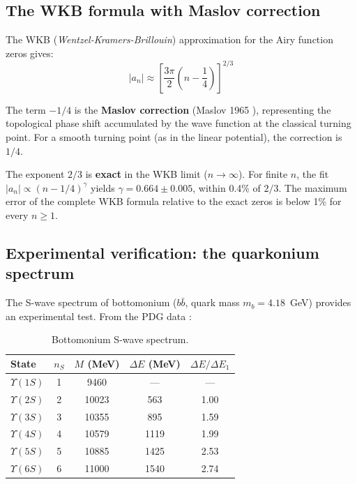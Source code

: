 \documentclass[10pt,a4paper]{article}
\begin{document}
\subsection{The WKB formula with Maslov correction}

The WKB (\textit{Wentzel-Kramers-Brillouin}) approximation for the Airy function zeros gives:
\begin{equation}
|a_n| \approx \left[\frac{3\pi}{2}\left(n - \frac{1}{4}\right)\right]^{2/3}
\end{equation}

The term $-1/4$ is the \textbf{Maslov correction} (Maslov 1965 \cite{Maslov1965}), representing the topological phase shift accumulated by the wave function at the classical turning point. For a smooth turning point (as in the linear potential), the correction is $1/4$.

The exponent $2/3$ is \textbf{exact} in the WKB limit ($n \to \infty$). For finite $n$, the fit $|a_n| \propto (n-1/4)^\gamma$ yields $\gamma = 0.664 \pm 0.005$, within 0.4\% of $2/3$. The maximum error of the complete WKB formula relative to the exact zeros is below 1\% for every $n \geq 1$.

\subsection{Experimental verification: the quarkonium spectrum}

The S-wave spectrum of bottomonium ($b\bar{b}$, quark mass $m_b = 4.18$~GeV) provides an experimental test. From the PDG data \cite{PDG2024}:

\begin{table}[h]
\centering
\caption{Bottomonium S-wave spectrum.}\label{tab:bottomonium}
\begin{tabular}{lcccc}
\toprule
State & $n_S$ & $M$ (MeV) & $\Delta E$ (MeV) & $\Delta E / \Delta E_1$ \\
\midrule
$\Upsilon(1S)$ & 1 & 9460 & --- & --- \\
$\Upsilon(2S)$ & 2 & 10023 & 563 & 1.00 \\
$\Upsilon(3S)$ & 3 & 10355 & 895 & 1.59 \\
$\Upsilon(4S)$ & 4 & 10579 & 1119 & 1.99 \\
$\Upsilon(5S)$ & 5 & 10885 & 1425 & 2.53 \\
$\Upsilon(6S)$ & 6 & 11000 & 1540 & 2.74 \\
\bottomrule
\end{tabular}
\end{table}
\end{document}
